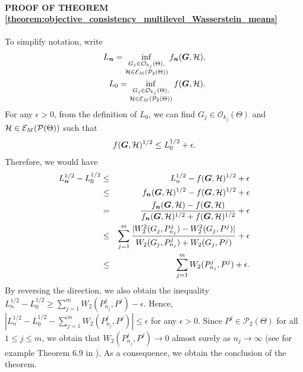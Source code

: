 \paragraph{PROOF OF THEOREM \ref{theorem:objective_consistency_multilevel_Wasserstein_means}} %
To simplify notation, write
\begin{eqnarray}
L_{\boldsymbol{n}}=\mathop {\inf }\limits_{\substack {G_{j} \in \mathcal{O}_{k_{j}}(\Theta), \\ \mathcal{H} \in \mathcal{E}_{M}(\mathcal{P}_{2}(\Theta))}}f_{\boldsymbol{n}}(\boldsymbol{G},\mathcal{H}), \nonumber \\
L_{0}=\mathop {\inf }\limits_{\substack {G_{j} \in \mathcal{O}_{k_{j}}(\Theta), \\ \mathcal{H} \in \mathcal{E}_{M}(\mathcal{P}_{2}(\Theta))}}f(\boldsymbol{G},\mathcal{H}). \nonumber
\end{eqnarray}
For any $\epsilon>0$, from the definition of $L_{0}$, we can find $G_{j} \in \mathcal{O}_{k_{j}}(\Theta)$ and $\mathcal{H} \in \mathcal{E}_{M}(\mathcal{P}(\Theta))$ such that
\begin{eqnarray}
f(\boldsymbol{G},\mathcal{H})^{1/2} \leq L_{0}^{1/2} + \epsilon. \nonumber
\end{eqnarray}
Therefore, we would have
\begin{eqnarray}
L_{\boldsymbol{n}}^{1/2}-L_{0}^{1/2} & \leq & L_{n}^{1/2}-f(\boldsymbol{G},\mathcal{H})^{1/2}+\epsilon \nonumber \\
& \leq & f_{\boldsymbol{n}}(\boldsymbol{G},\mathcal{H})^{1/2} - f(\boldsymbol{G},\mathcal{H})^{1/2}+\epsilon \nonumber \\
& = & \dfrac{f_{\boldsymbol{n}}(\boldsymbol{G},\mathcal{H})-f(\boldsymbol{G},\mathcal{H})}{f_{\boldsymbol{n}}(\boldsymbol{G},\mathcal{H})^{1/2}+f(\boldsymbol{G},\mathcal{H})^{1/2}} + \epsilon \nonumber \\
& \leq & \sum \limits_{j=1}^{m}\dfrac{|W_{2}^{2}(G_{j},P_{n_{j}}^{j})-W_{2}^{2}(G_{j},P^{j})|}{W_{2}(G_{j},P_{n_{j}}^{j})+W_{2}(G_{j},P^{j})}+\epsilon \nonumber \\
& \leq & \sum \limits_{j=1}^{m}{W_{2}(P_{n_{j}}^{j},P^{j})}+\epsilon. \nonumber
\end{eqnarray} 
By reversing the direction, we also obtain the inequality $L_{n}^{1/2}-L_{0}^{1/2} \geq \sum \limits_{j=1}^{m}{W_{2}(P_{n_{j}}^{j},P^{j})}-\epsilon$. Hence, $|L_{n}^{1/2}-L_{0}^{1/2}-\sum \limits_{j=1}^{m}{W_{2}(P_{n_{j}}^{j},P^{j})}| \leq \epsilon$ for any $\epsilon>0$. Since $P^{j} \in \mathcal{P}_{2}(\Theta)$ for all $1 \leq j \leq m$, we obtain that $W_{2}(P_{n_{j}}^{j},P^{j}) \to 0$ almost surely as $n_{j} \to \infty$ (see for example Theorem 6.9 in \citep{Villani-2009}). As a consequence, we obtain the conclusion of the theorem.
